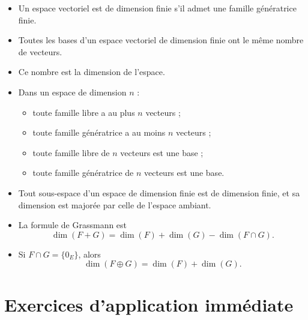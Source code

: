 \documentclass[11pt,a4paper]{article}
\theoremstyle{remark}
\begin{document}
\begin{itemize}
    \item Un espace vectoriel est de dimension finie s’il admet une famille génératrice finie.
    \item Toutes les bases d’un espace vectoriel de dimension finie ont le même nombre de vecteurs.
    \item Ce nombre est la dimension de l’espace.
    \item Dans un espace de dimension \(n\) :
    \begin{itemize}
        \item toute famille libre a au plus \(n\) vecteurs ;
        \item toute famille génératrice a au moins \(n\) vecteurs ;
        \item toute famille libre de \(n\) vecteurs est une base ;
        \item toute famille génératrice de \(n\) vecteurs est une base.
    \end{itemize}
    \item Tout sous-espace d’un espace de dimension finie est de dimension finie, et sa dimension est majorée par celle de l’espace ambiant.
    \item La formule de Grassmann est
    \[
    \dim(F+G)=\dim(F)+\dim(G)-\dim(F\cap G).
    \]
    \item Si \(F\cap G=\{0_E\}\), alors
    \[
    \dim(F\oplus G)=\dim(F)+\dim(G).
    \]
\end{itemize}

\section*{Exercices d’application immédiate}
\end{document}
